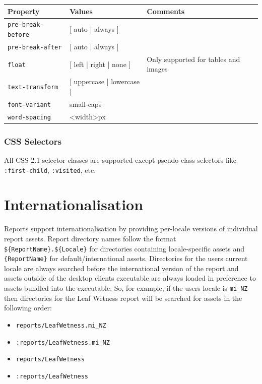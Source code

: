 \documentclass[a4paper,10pt]{book}
\begin{document}
\begin{tabular}{p{3.1cm} p{6cm} p{4.5cm}}
\hline
\textbf{Property} & \textbf{Values} & \textbf{Comments} \\
\hline

\verb|pre-break-before| & [ auto | always ] & \\
\verb|pre-break-after| & [ auto | always ] & \\
\verb|float| & [ left | right | none ] & Only supported for tables and images \\
\verb|text-transform| & [ uppercase | lowercase ] & \\
\verb|font-variant| & small-caps & \\
\verb|word-spacing| & <width>px & \\
\hline
\end{tabular}

\subsection{CSS Selectors}
All CSS 2.1 selector classes are supported except pseudo-class selectors like \verb|:first-child|, \verb|:visited|, etc.



\chapter{Internationalisation}
Reports support internationalisation by providing per-locale versions of individual report assets. Report directory names follow the format \verb|${ReportName}.${Locale}| for directories containing locale-specific assets and \verb|{ReportName}| for default/international assets. Directories for the users current locale are always searched before the international version of the report and assets outside of the desktop clients executable are always loaded in preference to assets bundled into the executable. So, for example, if the users locale is \verb|mi_NZ| then directories for the Leaf Wetness report will be searched for assets in the following order:

\begin{itemize}
\item \verb|reports/LeafWetness.mi_NZ|
\item \verb|:reports/LeafWetness.mi_NZ|
\item \verb|reports/LeafWetness|
\item \verb|:reports/LeafWetness|
\end{itemize}
\end{document}
